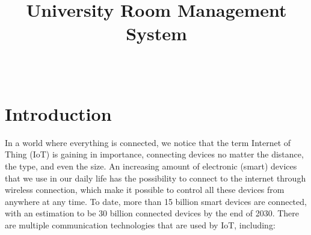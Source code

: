 \documentclass[conference,onecolumn]{IEEEtran}
\begin{document}
\title{University Room Management System\\} %

\author{\\ %

}

\maketitle
		

\begin{abstract}

\end{abstract}


\newpage
\tableofcontents

\newpage
\section{Introduction}
In a world where everything is connected, we notice that the term Internet of Thing (IoT) is gaining in importance, connecting devices no matter the distance, the type, and even the size. An increasing amount of electronic (smart) devices that we use in our daily life has the possibility to connect to the internet through wireless connection, which make it possible to control all these devices from anywhere at any time. To date, more than 15 billion smart devices are connected, with an estimation to be 30 billion connected devices by the end of 2030. There are multiple communication technologies that are used by IoT, including:
\end{document}
